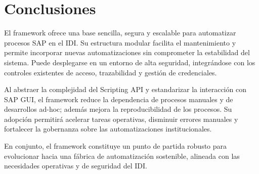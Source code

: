 \documentclass[11pt,a4paper]{article}
\begin{document}

\section{Conclusiones}

El framework ofrece una base sencilla, segura y escalable para automatizar procesos SAP en el IDI. Su estructura modular facilita el mantenimiento y permite incorporar nuevas automatizaciones sin comprometer la estabilidad del sistema. Puede desplegarse en un entorno de alta seguridad, integrándose con los controles existentes de acceso, trazabilidad y gestión de credenciales.

Al abstraer la complejidad del Scripting API y estandarizar la interacción con SAP GUI, el framework reduce la dependencia de procesos manuales y de desarrollos ad-hoc; además mejora la reproducibilidad de los procesos. Su adopción permitirá acelerar tareas operativas, disminuir errores manuales y fortalecer la gobernanza sobre las automatizaciones institucionales.

En conjunto, el framework constituye un punto de partida robusto para evolucionar hacia una fábrica de automatización sostenible, alineada con las necesidades operativas y de seguridad del IDI. 
\end{document}
